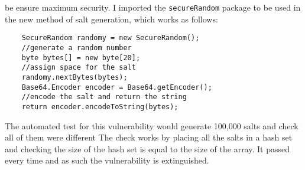 be ensure maximum security. I imported the \verb|secureRandom| package to be used in the new method of salt generation, which works as follows:
\begin{verbatim}
    SecureRandom randomy = new SecureRandom();
    //generate a random number
    byte bytes[] = new byte[20];
    //assign space for the salt
    randomy.nextBytes(bytes);
    Base64.Encoder encoder = Base64.getEncoder();
    //encode the salt and return the string
    return encoder.encodeToString(bytes);
\end{verbatim}
The automated test for this vulnerability would generate 100,000 salts and check all of them were different The check works by placing all the salts in a hash set and checking the
size of the hash set is equal to the size of the array. It passed every time and as such the vulnerability is extinguished.